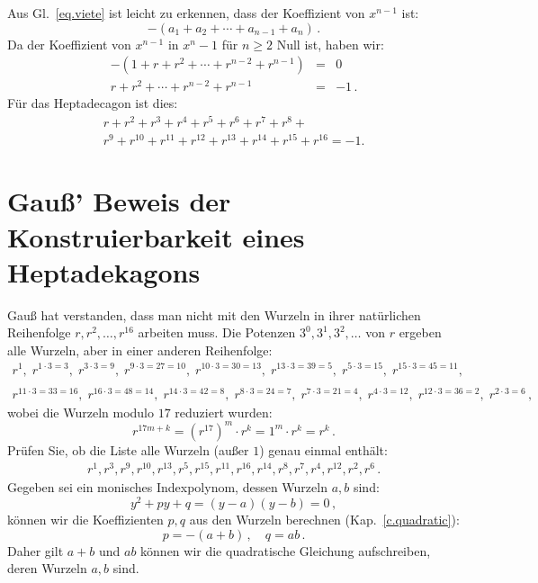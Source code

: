 Aus Gl.~\ref{eq.viete} ist leicht zu erkennen, dass der Koeffizient von $x^{n-1}$ ist:
\[
-(a_1+a_2+\cdots+a_{n-1}+a_n)\,.
\]
Da der Koeffizient von $x^{n-1}$ in $x^n-1$ für $n\geq 2$ Null ist, haben wir:
\begin{eqnarray*}
-(1+r+r^2+\cdots + r^{n-2}+r^{n-1})&=&0\\
r+r^2+\cdots + r^{n-2}+r^{n-1}&=&-1\,.
\end{eqnarray*}
Für das Heptadecagon ist dies:
\begin{multline}
r+r^2+r^3+r^4+r^5+r^6+r^7+r^8+\\
r^9+r^{10}+r^{11}+r^{12}+r^{13}+r^{14} + r^{15}+r^{16}=-1.\label{eq.minus-one}
\end{multline}

\section{Gauß' Beweis der Konstruierbarkeit eines Heptadekagons}\label{s.gauss}

Gauß hat verstanden, dass man nicht mit den Wurzeln in ihrer natürlichen Reihenfolge $r,r^2,\ldots,r^{16}$ arbeiten muss. Die Potenzen $3^0, 3^1, 3^2, \ldots$ von $r$ ergeben alle Wurzeln, aber in einer anderen Reihenfolge:
\[
\begin{array}{l}
r^1, \;r^{1\cdot 3 =3},\; r^{3\cdot 3=9},\; r^{9\cdot 3=27=10},\; r^{10\cdot 3=30=13},\; r^{13\cdot 3=39=5},\; r^{5\cdot 3=15},\; r^{15\cdot 3=45=11},\\\\
r^{11\cdot 3 =33=16}, \;r^{16\cdot 3=48=14},\; r^{14\cdot 3=42=8},\; r^{8\cdot 3=24=7},\;r^{7\cdot 3=21=4},\; r^{4\cdot 3=12},\; r^{12\cdot 3=36=2},\; r^{2\cdot 3=6}\,,
\end{array}
\]
wobei die Wurzeln modulo $17$ reduziert wurden:
\[
r^{17m+k}=(r^{17})^m\cdot r^k=1^m\cdot r^k=r^k\,.
\]
Prüfen Sie, ob die Liste alle Wurzeln (außer $1$) genau einmal enthält:
\begin{align}\label{eq.roots}
r^1, r^3, r^9, r^{10}, r^{13}, r^5, r^{15}, r^{11}, r^{16}, r^{14}, r^8, r^7, r^4, r^{12}, r^2, r^6\,.
\end{align}
Gegeben sei ein monisches Indexpolynom, dessen Wurzeln $a,b$ sind:
\[
y^2+py+q=(y-a)(y-b)=0\,,
\]
können wir die Koeffizienten $p,q$ aus den Wurzeln berechnen (Kap.~\ref{c.quadratic}):
\[
p=-(a+b)\,,\quad q=ab\,.
\]
Daher gilt $a+b$ und $ab$ können wir die quadratische Gleichung aufschreiben, deren Wurzeln $a,b$ sind.

